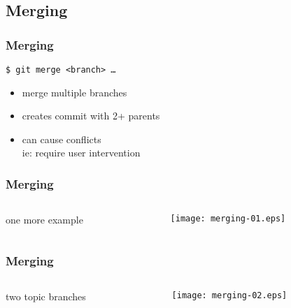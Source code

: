 \documentclass[english]{beamer}
\newcommand{\mysubsection}[2]{%
  \hypertarget{#2}{}%
  \subsection{#1}%
  \label{#2}%
}
\newcommand{\CMD}[1]{%
\texttt{\textcolor{code-green}{#1}}%
}
\newcommand{\faint}[1]{%
\textcolor{code-gray}{#1}%
}
\newcommand{\red}[1]{%
\textcolor{code-red}{#1}%
}
\begin{document}
\mysubsection{Merging}{using:merging}
\begin{frame}
\frametitle{Merging}

\CMD{\$ git merge <branch> \ldots} \\
\begin{itemize}
        \item merge multiple branches
        \item creates commit with 2+ parents
        \item can cause \red{conflicts} \\
                \faint{ie: require user intervention}
\end{itemize}
\end{frame}

\begin{frame}
\frametitle{Merging}

\begin{columns}[t]
        \begin{column}[T]{.5\textwidth}
                one more example
        \end{column}
        \begin{column}[T]{.5\textwidth}
                \texttt{[image: merging-01.eps]}
        \end{column}
\end{columns}
\end{frame}

\begin{frame}
\frametitle{Merging}

\begin{columns}[t]
        \begin{column}[T]{.5\textwidth}
                two topic branches
        \end{column}
        \begin{column}[T]{.5\textwidth}
                \texttt{[image: merging-02.eps]}
        \end{column}
\end{columns}
\end{frame}
\end{document}
